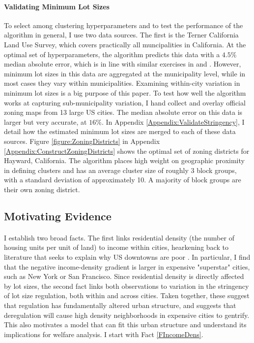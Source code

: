 \documentclass[12pt]{article}
\begin{document}
	 \paragraph{Validating Minimum Lot Sizes} To select among clustering hyperparameters and to test the performance of the algorithm in general, I use two data sources. The first is the Terner California Land Use Survey, which covers practically all muncipalities in California. At the optimal set of hyperparameters, the algorithm predicts this data with a $4.5 \%$ median absolute error, which is in line with similar exercises in \cite{Song} and \cite{Cui}. However, minimum lot sizes in this data are aggregated at the municipality level, while in most cases they vary within municipalities. Examining within-city variation in minimum lot sizes is a big purpose of this paper. To test how well the algorithm works at capturing sub-municipality variation, I hand collect and overlay official zoning maps from 13 large US cities. The median absolute error on this data is larger but very accurate, at $16 \%$. In Appendix \ref{Appendix:ValidateStringency}, I detail how the estimated minimum lot sizes are merged to each of these data sources. Figure \ref{figure:ZoningDistricts} in Appendix \ref{Appendix:ConstructZoningDistricts} shows the optimal set of zoning districts for Hayward, California. The algorithm places high weight on geographic proximity in defining clusters and has an average cluster size of roughly 3 block groups, with a standard deviation of approximately 10. A majority of block groups are their own zoning district.
	 
	 
	 \subsection{Motivating Evidence}
	 
	 \paragraph*{}
	 I establish two broad facts. The first links residential density (the number of housing units per unit of land) to income within cities, hearkening back to literature that seeks to explain why US downtowns are poor \citep{Gentrificationcycles, ccpoortransport, parispoor}. In particular, I find that the negative income-density gradient is larger in expensive "superstar" cities, such as New York or San Francisco. Since residential density is directly affected by lot sizes, the second fact links both observations to variation in the stringency of lot size regulation, both within and across cities. Taken together, these suggest that regulation has fundamentally altered urban structure, and suggests that deregulation will cause high density neighborhoods in expensive cities to gentrify. This also motivates a model that can fit this urban structure and understand its implications for welfare analysis. I start with Fact \ref{FIncomeDens}. 
\end{document}
